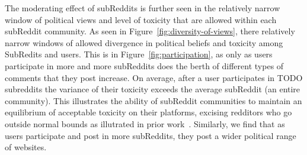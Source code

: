 The moderating effect of subReddits is further seen in the relatively narrow window of political views and level of toxicity that are allowed within each subReddit community. As seen in Figure~\ref{fig:diversity-of-views}, there relatively narrow windows of allowed divergence in political beliefs and toxicity among SubRedits and users. This is in Figure~\ref{fig:participation}, as only as users participate in more and more subReddits does the berth of different types of comments that they post increase. On average, after a user participates in TODO subreddits the variance of their toxicity exceeds the average subReddit (an entire community). This illustrates the ability of subReddit communities to maintain an equilibrium of acceptable toxicity on their platforms, excising redditors who go outside normal bounds as illutrated in prior work~\cite{rajadesingan2020quick}.  Similarly, we find  that as users participate and post in more subReddits, they post a wider political range of websites.


